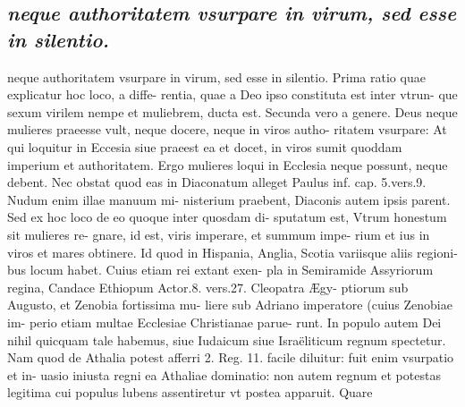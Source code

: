 \documentclass{article}
\begin{document}
\begin{pages}
\subsection*{\textit{neque authoritatem vsurpare in virum, sed esse in silentio.}}neque authoritatem vsurpare in virum, sed esse in silentio. Prima ratio quae explicatur hoc loco, a diffe- rentia, quae a Deo ipso constituta est inter vtrun- que sexum virilem nempe et muliebrem, ducta est. Secunda vero a genere. Deus neque mulieres praeesse vult, neque docere, neque in viros autho- ritatem vsurpare: At qui loquitur in Eccesia siue praeest ea et docet, in viros sumit quoddam imperium et authoritatem. Ergo mulieres loqui in Ecclesia neque possunt, neque debent. Nec obstat quod eas in Diaconatum alleget Paulus inf. cap. 5.vers.9. Nudum enim illae manuum mi- nisterium praebent, Diaconis autem ipsis parent. Sed ex hoc loco de eo quoque inter quosdam di- sputatum est, Vtrum honestum sit mulieres re- gnare, id est, viris imperare, et summum impe- rium et ius in viros et mares obtinere. Id quod in Hispania, Anglia, Scotia variisque aliis regioni- bus locum habet. Cuius etiam rei extant exen- pla in Semiramide Assyriorum regina, Candace Ethiopum Actor.8. vers.27. Cleopatra Ægy- ptiorum sub Augusto, et Zenobia fortissima mu- liere sub Adriano imperatore (cuius Zenobiae im- perio etiam multae Ecclesiae Christianae parue- runt. In populo autem Dei nihil quicquam tale habemus, siue Iudaicum siue Israëliticum regnum spectetur. Nam quod de Athalia potest afferri 2. Reg. 11. facile diluitur: fuit enim vsurpatio et in- uasio iniusta regni ea Athaliae dominatio: non autem regnum et potestas legitima cui populus lubens assentiretur vt postea apparuit. Quare  \pend

\end{pages}
\end{document}
